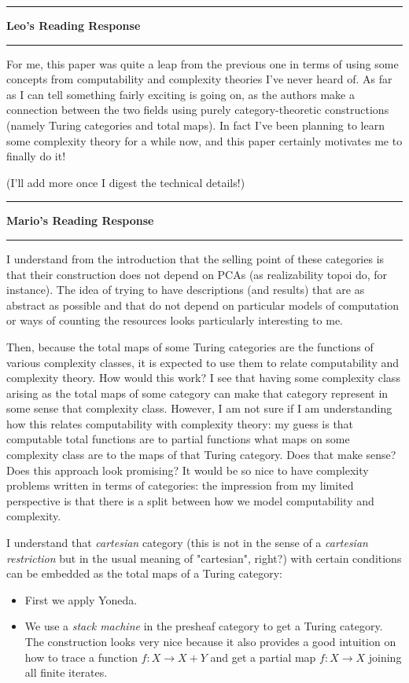 \documentclass{amsart}
\newcommand{\iam}[1]{
  \vspace{0.25em}
  \hrule
  \vspace{0.25em}
  \textbf{{#1}'s Reading Response}
  \vspace{0.25em}
  \hrule
  \vspace{1em}
}
\begin{document}
\iam{Leo}
For me, this paper was quite a leap from the previous one in terms of using some concepts from computability and complexity theories I've never heard of. As far as I can tell something fairly exciting is going on, as the authors make a connection between the two fields using purely category-theoretic constructions (namely Turing categories and total maps). In fact I've been planning to learn some complexity theory for a while now, and this paper certainly motivates me to finally do it!

(I'll add more once I digest the technical details!)


\iam{Mario}
I understand from the introduction that the selling point of these
categories is that their construction does not depend on PCAs (as
realizability topoi do, for instance).  The idea of trying to have
descriptions (and results) that are as abstract as possible and that
do not depend on particular models of computation or ways of counting
the resources looks particularly interesting to me.

Then, because the total maps of some Turing categories are the
functions of various complexity classes, it is expected to use them to
relate computability and complexity theory.  How would this work? I
see that having some complexity class arising as the total maps of
some category can make that category represent in some sense that
complexity class.  However, I am not sure if I am understanding how
this relates computability with complexity theory: my guess is that
computable total functions are to partial functions what maps on some
complexity class are to the maps of that Turing category. Does that
make sense? Does this approach look promising? It would be so nice to
have complexity problems written in terms of categories: the
impression from my limited perspective is that there is a split
between how we model computability and complexity.

I understand that \emph{cartesian} category (this is not in the sense of a
\emph{cartesian restriction} but in the usual meaning of "cartesian",
right?) with certain conditions can be embedded as the total maps of a
Turing category:

\begin{itemize}
\item First we apply Yoneda.
\item We use a \emph{stack machine} in the presheaf category to get a
  Turing category.  The construction looks very nice because it also
  provides a good intuition on how to trace a function
  $f \colon X \to X + Y$ and get a partial map $f \colon X \to X$
  joining all finite iterates.
\end{itemize}
\end{document}
